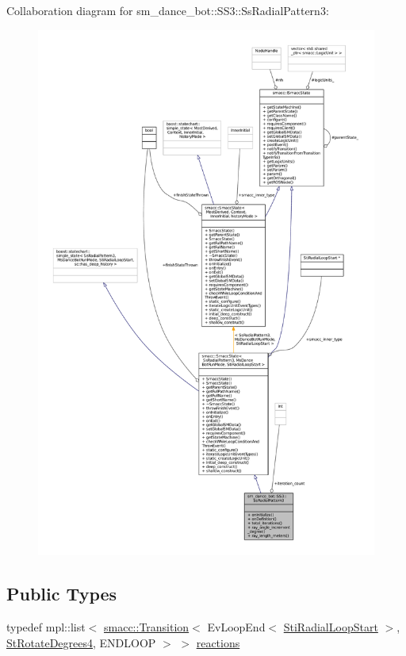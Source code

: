 Collaboration diagram for sm\+\_\+dance\+\_\+bot\+:\+:S\+S3\+:\+:Ss\+Radial\+Pattern3\+:
\nopagebreak
\begin{figure}[H]
\begin{center}
\leavevmode
\includegraphics[width=350pt]{structsm__dance__bot_1_1SS3_1_1SsRadialPattern3__coll__graph}
\end{center}
\end{figure}
\subsection*{Public Types}
\begin{DoxyCompactItemize}
\item 
typedef mpl\+::list$<$ \hyperlink{classsmacc_1_1Transition}{smacc\+::\+Transition}$<$ Ev\+Loop\+End$<$ \hyperlink{structsm__dance__bot_1_1radial__motion__states_1_1StiRadialLoopStart}{Sti\+Radial\+Loop\+Start} $>$, \hyperlink{structsm__dance__bot_1_1StRotateDegrees4}{St\+Rotate\+Degrees4}, E\+N\+D\+L\+O\+OP $>$ $>$ \hyperlink{structsm__dance__bot_1_1SS3_1_1SsRadialPattern3_aeaf43b088070c72d0685effd918eff64}{reactions}
\end{DoxyCompactItemize}
